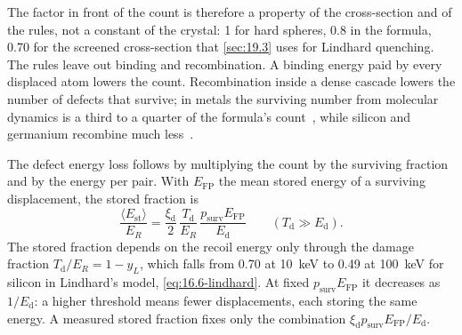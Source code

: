 The factor in front of the count is therefore a property of the cross-section and of the rules, not a constant of the crystal: 1 for hard spheres, 0.8 in the formula, 0.70 for the screened cross-section that \cref{sec:19.3} uses for Lindhard quenching. The rules leave out binding and recombination. A binding energy paid by every displaced atom lowers the count. Recombination inside a dense cascade lowers the number of defects that survive; in metals the surviving number from molecular dynamics is a third to a quarter of the formula's count~\cite{nordlund2018improving}, while silicon and germanium recombine much less~\cite[Sect.~II\,B]{sassi2022energy}.

The defect energy loss follows by multiplying the count by the surviving fraction and by the energy per pair. With $E_{\mathrm{FP}}$ the mean stored energy of a surviving displacement, the stored fraction is
\begin{equation}
  \frac{\langle E_{\mathrm{st}}\rangle}{E_R} = \frac{\xi_{\mathrm{d}}}{2}\,\frac{T_{\mathrm{d}}}{E_R}\,\frac{p_{\mathrm{surv}}E_{\mathrm{FP}}}{E_{\mathrm{d}}} \qquad (T_{\mathrm{d}} \gg E_{\mathrm{d}}) .
  \label{eq:19.4-loss}
\end{equation}
The stored fraction depends on the recoil energy only through the damage fraction $T_{\mathrm{d}}/E_R = 1 - y_L$, which falls from 0.70 at \SI{10}{keV} to 0.49 at \SI{100}{keV} for silicon in Lindhard's model, \cref{eq:16.6-lindhard}. At fixed $p_{\mathrm{surv}}E_{\mathrm{FP}}$ it decreases as $1/E_{\mathrm{d}}$: a higher threshold means fewer displacements, each storing the same energy. A measured stored fraction fixes only the combination $\xi_{\mathrm{d}}p_{\mathrm{surv}}E_{\mathrm{FP}}/E_{\mathrm{d}}$.

